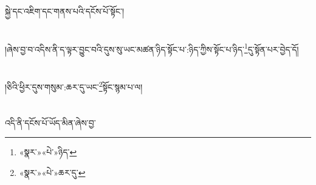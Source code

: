 སྐྱེ་དང་འཇིག་དང་གནས་པའི་དངོས་པོ་སྟོང་།\chapter{ }།ཞེས་བྱ་བ་འདིས་ནི་ད་ལྟར་བྱུང་བའི་དུས་སུ་ཡང་མཚན་ཉིད་སྟོང་པ་:ཉིད་ཀྱིས་སྟོང་པ་ཉིད་\footnote{«སྣར་»«པེ་»ཉིད་}དུ་སྟོན་པར་བྱེད་དོ།\chapter{ }།ཅིའི་ཕྱིར་དུས་གསུམ་:ཆར་དུ་ཡང་\footnote{«སྣར་»«པེ་»ཆར་དུ་}སྟོང་སྙམ་པ་ལ།\chapter{ }འདི་ནི་དངོས་པོ་ཡོད་མིན་ཞེས་བྱ་